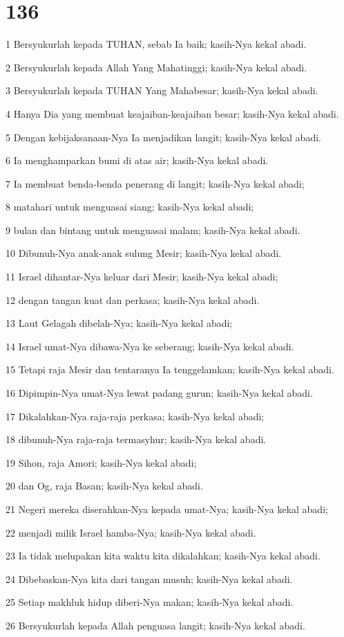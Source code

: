 \chapter{136}

\par 1 Bersyukurlah kepada TUHAN, sebab Ia baik; kasih-Nya kekal abadi.
\par 2 Bersyukurlah kepada Allah Yang Mahatinggi; kasih-Nya kekal abadi.
\par 3 Bersyukurlah kepada TUHAN Yang Mahabesar; kasih-Nya kekal abadi.
\par 4 Hanya Dia yang membuat keajaiban-keajaiban besar; kasih-Nya kekal abadi.
\par 5 Dengan kebijaksanaan-Nya Ia menjadikan langit; kasih-Nya kekal abadi.
\par 6 Ia menghamparkan bumi di atas air; kasih-Nya kekal abadi.
\par 7 Ia membuat benda-benda penerang di langit; kasih-Nya kekal abadi;
\par 8 matahari untuk menguasai siang; kasih-Nya kekal abadi;
\par 9 bulan dan bintang untuk menguasai malam; kasih-Nya kekal abadi.
\par 10 Dibunuh-Nya anak-anak sulung Mesir; kasih-Nya kekal abadi.
\par 11 Israel dihantar-Nya keluar dari Mesir; kasih-Nya kekal abadi;
\par 12 dengan tangan kuat dan perkasa; kasih-Nya kekal abadi.
\par 13 Laut Gelagah dibelah-Nya; kasih-Nya kekal abadi;
\par 14 Israel umat-Nya dibawa-Nya ke seberang; kasih-Nya kekal abadi.
\par 15 Tetapi raja Mesir dan tentaranya Ia tenggelamkan; kasih-Nya kekal abadi.
\par 16 Dipimpin-Nya umat-Nya lewat padang gurun; kasih-Nya kekal abadi.
\par 17 Dikalahkan-Nya raja-raja perkasa; kasih-Nya kekal abadi;
\par 18 dibunuh-Nya raja-raja termasyhur; kasih-Nya kekal abadi.
\par 19 Sihon, raja Amori; kasih-Nya kekal abadi;
\par 20 dan Og, raja Basan; kasih-Nya kekal abadi.
\par 21 Negeri mereka diserahkan-Nya kepada umat-Nya; kasih-Nya kekal abadi;
\par 22 menjadi milik Israel hamba-Nya; kasih-Nya kekal abadi.
\par 23 Ia tidak melupakan kita waktu kita dikalahkan; kasih-Nya kekal abadi.
\par 24 Dibebaskan-Nya kita dari tangan musuh; kasih-Nya kekal abadi.
\par 25 Setiap makhluk hidup diberi-Nya makan; kasih-Nya kekal abadi.
\par 26 Bersyukurlah kepada Allah penguasa langit; kasih-Nya kekal abadi.

